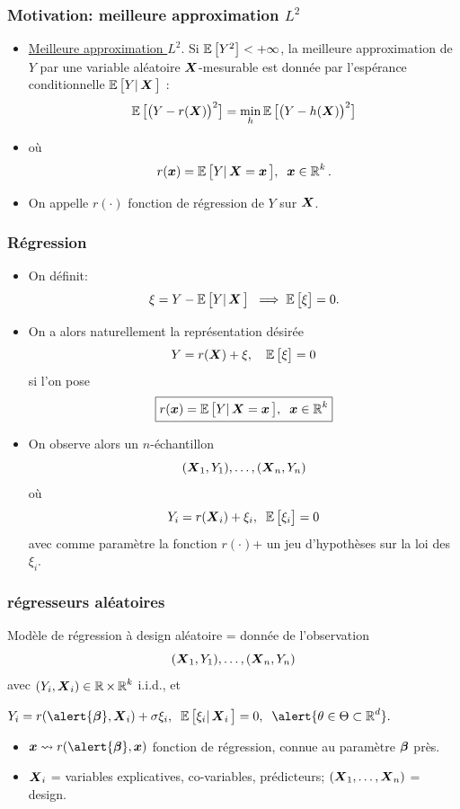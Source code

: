 \begin{frame}
\frametitle{Motivation: meilleure approximation $L^2$}
\begin{itemize}
\item \underline{Meilleure approximation $L^2$}. Si
$\E\big[Y^2\big]<+\infty$, la meilleure approximation de $Y$ par une
variable aléatoire $\bX$-mesurable est donnée par
\alert{l'espérance conditionnelle} $\E\big[Y|\bX\big]$ :
$$\E\big[\big(Y-r(\bX)\big)^2\big] = \min_h \E\big[\big(Y-h(\bX)\big)^2\big]$$
\item o\`u
$$r(\bx) = \E\big[Y|\bX=\bx\big],\;\;\bx \in \R^k.$$
\item On appelle $r(\cdot)$ \alert{fonction de régression de $Y$ sur
$\bX$}.
\end{itemize}
\end{frame}

\begin{frame}
\frametitle{Régression}
\begin{itemize}
\item On définit:
$$\xi = Y-\E\big[Y|\bX \big]\;\;\Longrightarrow\; \E\big[\xi\big]=0.$$
\item On a alors naturellement la représentation désirée
$$Y=r(\bX)+\xi, \quad \E\big[\xi\big]=0$$
si l'on pose
$$\boxed{r(\bx) = \E\big[Y|\bX=\bx\big],\;\;\bx \in \R^k}$$

\item On observe alors un $n$-échantillon
$$(\bX_1,Y_1),\ldots, (\bX_n,Y_n)$$
où
$$Y_i = r(\bX_i)+\xi_i,\;\;\E\big[\xi_i\big]=0$$
avec comme \alert{paramètre la fonction $r(\cdot)$}+ un \alert{jeu d'hypothèses} sur la loi des $\xi_i$.
\end{itemize}
\end{frame}

\begin{frame}
\frametitle{régresseurs aléatoires}
\begin{df}
Modèle de régression \alert{à design aléatoire} = donnée de
l'observation
$$(\bX_1,Y_1),\ldots, (\bX_n,Y_n)$$
avec $(Y_i,\bX_i)\in \R\times \R^k$ \alert{i.i.d.},
et\\\vspace{3mm} \centerline{$Y_i =
r(\alert{\truebeta},\bX_i)+ \sigma \xi_i,\;\;
\E\big[\xi_i|\bX_i\big]=0,\;\;\alert{
\truetheta \in \Theta \subset \R^d}.$}
\begin{itemize}
\item $\bx \leadsto r(\alert{\truebeta},\bx)$ fonction de \alert{ régression}, connue au paramètre
$\truebeta$ près.
\item $\bX_i$ = variables explicatives, co-variables, prédicteurs;
$(\bX_1,\ldots,\bX_n)$ = \alert{design}.
\end{itemize}
\end{df}
\end{frame}


